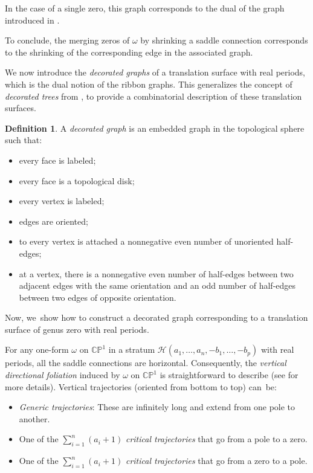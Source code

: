 \documentclass[JEP,XML,SOM,Unicode,NoFloatCountersInSection,published]{cedram}
\theoremstyle{definition}
\newtheorem{defn}[thm]{Definition}
\begin{document}
In the case of a single zero, this graph corresponds to the dual of the graph introduced in \cite{GeTaIso}.

To conclude, the merging zeros of $\omega$ by shrinking a saddle connection corresponds to the shrinking of the corresponding edge in the associated graph.

We now introduce the \textit{decorated graphs} of a translation surface with real periods, which is the dual notion of the ribbon graphs. This generalizes the concept of \textit{decorated trees} from \cite{GeTaIso}, to provide a combinatorial description of these translation surfaces.

\begin{defn}\label{defn:abstractdecoratedtgraph}
A \textit{decorated graph} is an embedded graph in the topological sphere such that:
\begin{itemize}
\item every face is labeled;
\item every face is a topological disk;
\item every vertex is labeled;
\item edges are oriented;
\item to every vertex is attached a nonnegative even number of unoriented half-edges;
\item at a vertex, there is a nonnegative even number of half-edges between two adjacent edges with the same orientation and an odd number of half-edges between two edges of opposite orientation.
\end{itemize}
\end{defn}

Now, we~show how to construct a decorated graph corresponding to a translation surface of genus zero with real periods.

For any one-form $\omega$ on $\mathbb{CP}^{1}$ in a stratum $\mathcal{H}(a_{1},\dots,a_{n},-b_{1},\dots,-b_{p})$ with real periods, all the saddle connections are horizontal. Consequently, the \textit{vertical directional foliation} induced by $\omega$ on $\mathbb{CP}^{1}$ is straightforward to describe (see \cite[Prop.\,5.5]{tahar} for more details). Vertical trajectories (oriented from bottom to top) can~be:
\begin{itemize}
\item \textit{Generic trajectories}: These are infinitely long and extend from one pole to another.
\item One of the $\sum_{i=1}^n (a_{i}+1)$ \textit{critical trajectories} that go from a pole to a zero.
\item One of the $\sum_{i=1}^n (a_{i}+1)$ \textit{critical trajectories} that go from a zero to a pole.
\end{itemize}
\end{document}
